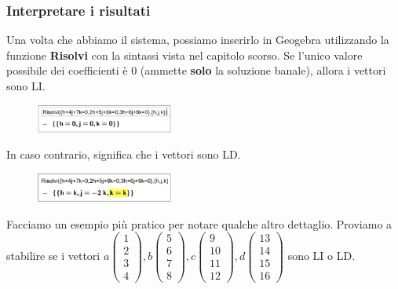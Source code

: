 \documentclass[../main.tex]{subfiles}
\begin{document}
\vspace{1cm}
\subsubsection{Interpretare i risultati}
Una volta che abbiamo il sistema, possiamo inserirlo in Geogebra utilizzando la funzione \textbf{Risolvi} con la sintassi vista nel capitolo
scorso. Se l'unico valore possibile dei coefficienti è $0$ (ammette \textbf{solo} la soluzione banale), allora i vettori sono LI.
\begin{figure}[h]
    \centering
    \includegraphics[width=0.4\textwidth]{../images/casLI.png}
\end{figure}

In caso contrario, significa che i vettori sono LD.
\begin{figure}[h]
    \centering
    \includegraphics[width=0.4\textwidth]{../images/casLD.png}
\end{figure}

\vspace{1cm}
Facciamo un esempio più pratico per notare qualche altro dettaglio. Proviamo a stabilire se i vettori $a \begin{pmatrix}1 \\ 2 \\ 3 \\ 4 \end{pmatrix}, b \begin{pmatrix}5 \\ 6 \\ 7 \\ 8\end{pmatrix}, c \begin{pmatrix}9 \\ 10 \\ 11 \\ 12 \end{pmatrix}, d \begin{pmatrix}13 \\ 14 \\ 15 \\ 16 \end{pmatrix}$
sono LI o LD.
\end{document}
